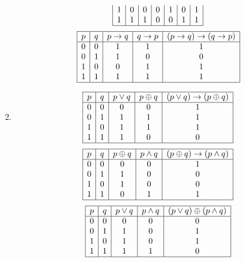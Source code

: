 \documentclass[12pt]{article}
\newcommand{\enumset}[1]{\setcounter{enumi}{#1}}
\begin{document}
\begin{enumerate}
\begin{tasks}
\[\begin{array}{|*{7}{c|}}
								1 & 0 & 0 & 0 & 1 & 0 & 1 \\
								1 & 1 & 1 & 0 & 0 & 1 & 1 \\\hline
							\end{array}\]
						\task
							\[\begin{array}{|*{5}{c|}}\hline
								p & q & p \to q & q \to p & (p \to q ) \to (q \to p) \\\hline
								0 & 0 & 1 & 1 & 1 \\
								0 & 1 & 1 & 0 & 0 \\
								1 & 0 & 0 & 1 & 1 \\
								1 & 1 & 1 & 1 & 1 \\\hline
							\end{array}\]
					\end{tasks}
					\enumset{34}
					\item
						\begin{tasks}
							\task
								\[\begin{array}{|*{5}{c|}}\hline
									p & q & p \lor q & p \oplus q & (p \lor q) \to (p \oplus q) \\\hline
									0 & 0 & 0 & 0 & 1 \\
									0 & 1 & 1 & 1 & 1 \\
									1 & 0 & 1 & 1 & 1 \\
									1 & 1 & 1 & 0 & 0 \\\hline
								\end{array}\]
							\task
								\[\begin{array}{|*{5}{c|}}\hline
									p & q & p \oplus q & p \land q & (p \oplus q) \to (p \land q) \\\hline
									0 & 0 & 0 & 0 & 1 \\
									0 & 1 & 1 & 0 & 0 \\
									1 & 0 & 1 & 0 & 0 \\
									1 & 1 & 0 & 1 & 1 \\\hline
								\end{array}\]
							\task
								\[\begin{array}{|*{5}{c|}}\hline
									p & q & p \lor q & p \land q & (p \lor q ) \oplus (p \land q) \\\hline
									0 & 0 & 0 & 0 & 0 \\
									0 & 1 & 1 & 0 & 1 \\
									1 & 0 & 1 & 0 & 1 \\
									1 & 1 & 1 & 1 & 0 \\\hline
								\end{array}\]

\end{tasks}
\end{enumerate}
\end{document}
